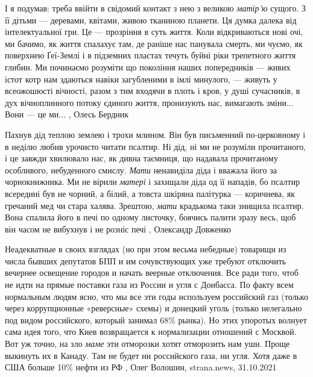 І я подумав: треба ввійти в свідомий контакт з нею з великою \emph{матір’ю} сущого. З
її дітьми — деревами, квітами, живою тканиною планети. Ця думка далека від
інтелектуальної гри. Це — прозріння в суть життя. Коли відкриваються нові очі,
ми бачимо, як життя спалахує там, де раніше нас панувала смерть, ми чуємо, як
поверхнею Ґеї-Землі і в підземних пластах течуть буйні ріки трепетного життя
глибин. Ми починаємо розуміти що покоління наших попередників — живих істот
котр нам здаються навіки загубленими в імлі минулого, — живуть у всеожошюсті
вічності, разом з тим входячи в плоть і кров, у душі сучасників, в дух
вічноплинного потоку єдиного життя, пронизують нас, вимагають зміни... Вони — це
ми...
, Олесь Бердник

Пахнув дід теплою землею і трохи млином. Він був письменний по-церковному і в
неділю любив урочисто читати псалтир. Ні дід, ні ми не розуміли прочитаного, і
це завжди хвилювало нас, як дивна таємниця, що надавала прочитаному особливого,
небуденного смислу.  \emph{Мати} ненавиділа діда і вважала його за
чорнокнижника. Ми не вірили \emph{матері} і захищали діда од її нападів, бо
псалтир всередині був не чорний, а білий, а товста шкіряна палітурка —
коричнева, як гречаний мед чи стара халява. Зрештою, \emph{мати} крадькома таки
знищила псалтир. Вона спалила його в печі по одному листочку, боячись палити
зразу весь, щоб він часом не вибухнув і не розніс печі
, Олександр Довженко

Неадекватные в своих взглядах (но при этом весьма небедные) товарищи из числа
бывших депутатов БПП и им сочувствующих уже требуют отключить вечернее
освещение городов и начать веерные отключения. Все ради того, чтоб не идти на
прямые поставки газа из России и угля с Донбасса. По факту всем нормальным
людям ясно, что мы все эти годы используем российский газ (только через
коррупционные «реверсные» схемы) и донецкий уголь (только нелегально под видом
российского, который занимал 68\% рынка). Но этих упоротых волнует сама идея
того, что Киев возвращается к нормализации отношений с Москвой.  Вот уж точно,
на зло \emph{маме} эти отморозки хотят отморозить нам уши. Проще выкинуть их в
Канаду. Там не будет ни российского газа, ни угля. Хотя даже в США больше 10\%
нефти из РФ
, 
Олег Волошин, strana.news, 31.10.2021

